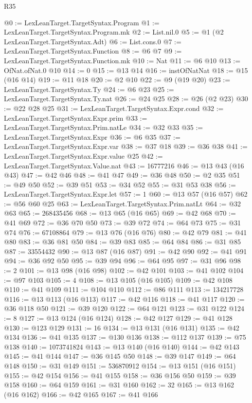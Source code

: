 \begin{lexlean}{R35}
\begin{coremodule}
@0 := LexLeanTarget.TargetSyntax.Program
@1 := LexLeanTarget.TargetSyntax.Program.mk
@2 := List.nil.{0}
@5 := @1 (@2 LexLeanTarget.TargetSyntax.Adt)
@6 := List.cons.{0}
@7 := LexLeanTarget.TargetSyntax.Function
@8 := @6 @7
@9 := LexLeanTarget.TargetSyntax.Function.mk
@10 := Nat
@11 := @6 @10
@13 := OfNat.ofNat.{0} @10
@14 := 0
@15 := @13 @14
@16 := instOfNatNat
@18 := @15 (@16 @14)
@19 := @11 @18
@20 := @2 @10
@22 := @9 (@19 @20)
@23 := LexLeanTarget.TargetSyntax.Ty
@24 := @6 @23
@25 := LexLeanTarget.TargetSyntax.Ty.nat
@26 := @24 @25
@28 := @26 (@2 @23)
@30 := @22 @28 @25
@31 := LexLeanTarget.TargetSyntax.Expr.cond
@32 := LexLeanTarget.TargetSyntax.Expr.prim
@33 := LexLeanTarget.TargetSyntax.Prim.natLe
@34 := @32 @33
@35 := LexLeanTarget.TargetSyntax.Expr
@36 := @6 @35
@37 := LexLeanTarget.TargetSyntax.Expr.var
@38 := @37 @18
@39 := @36 @38
@41 := LexLeanTarget.TargetSyntax.Expr.value @25
@42 := LexLeanTarget.TargetSyntax.Value.nat
@43 := 16777216
@46 := @13 @43 (@16 @43)
@47 := @42 @46
@48 := @41 @47
@49 := @36 @48
@50 := @2 @35
@51 := @49 @50
@52 := @39 @51
@53 := @34 @52
@55 := @31 @53 @38
@56 := LexLeanTarget.TargetSyntax.Expr.let
@57 := 1
@60 := @13 @57 (@16 @57)
@62 := @56 @60 @25
@63 := LexLeanTarget.TargetSyntax.Prim.natLt
@64 := @32 @63
@65 := 268435456
@68 := @13 @65 (@16 @65)
@69 := @42 @68
@70 := @41 @69
@72 := @36 @70 @50
@73 := @39 @72
@74 := @64 @73
@75 := @31 @74
@76 := 67108864
@79 := @13 @76 (@16 @76)
@80 := @42 @79
@81 := @41 @80
@83 := @36 @81 @50
@84 := @39 @83
@85 := @64 @84
@86 := @31 @85
@87 := 33554432
@90 := @13 @87 (@16 @87)
@91 := @42 @90
@92 := @41 @91
@94 := @36 @92 @50
@95 := @39 @94
@96 := @64 @95
@97 := @31 @96
@98 := 2
@101 := @13 @98 (@16 @98)
@102 := @42 @101
@103 := @41 @102
@104 := @97 @103
@105 := 4
@108 := @13 @105 (@16 @105)
@109 := @42 @108
@110 := @41 @109
@111 := @104 @110
@112 := @86 @111
@113 := 134217728
@116 := @13 @113 (@16 @113)
@117 := @42 @116
@118 := @41 @117
@120 := @36 @118 @50
@121 := @39 @120
@122 := @64 @121
@123 := @31 @122
@124 := 8
@127 := @13 @124 (@16 @124)
@128 := @42 @127
@129 := @41 @128
@130 := @123 @129
@131 := 16
@134 := @13 @131 (@16 @131)
@135 := @42 @134
@136 := @41 @135
@137 := @130 @136
@138 := @112 @137
@139 := @75 @138
@140 := 1073741824
@143 := @13 @140 (@16 @140)
@144 := @42 @143
@145 := @41 @144
@147 := @36 @145 @50
@148 := @39 @147
@149 := @64 @148
@150 := @31 @149
@151 := 536870912
@154 := @13 @151 (@16 @151)
@155 := @42 @154
@156 := @41 @155
@158 := @36 @156 @50
@159 := @39 @158
@160 := @64 @159
@161 := @31 @160
@162 := 32
@165 := @13 @162 (@16 @162)
@166 := @42 @165
@167 := @41 @166

\end{coremodule}
\end{lexlean}

